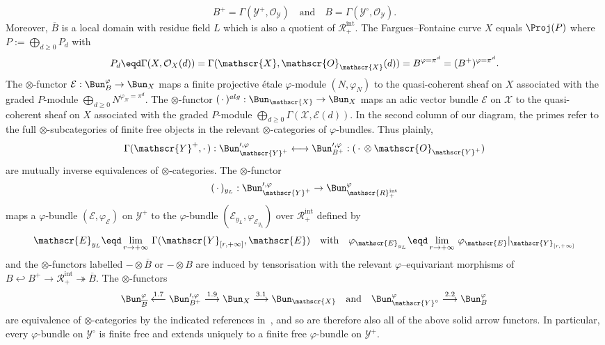 \[
B^{+}=\Gamma(\mathscr{Y}^{+},\mathscr{O}_{\mathscr{Y}})\quad\text{and}\quad B=\Gamma(\mathscr{Y}^{\circ},\mathscr{O}_{\mathscr{Y}}).
\]
Moreover, $\overline{B}$ is a local domain with residue field $L$ which is also a quotient of $\mathscr{R}_{+}^{\mathrm{int}}$. The Fargues--Fontaine curve $X$ equals $\Proj(P)$ where $P:=\bigoplus_{d\geq0}P_{d}$ with
\[
P_{d}\eqd\Gamma(X,\mathcal{O}_{X}(d))=\Gamma(\mathscr{X},\mathscr{O}_{\mathscr{X}}(d))=B^{\varphi=\pi^{d}}=(B^{+})^{\varphi=\pi^{d}}.
\]
The $\otimes$-functor $\mathcal{E}:\Bun_{B}^{\varphi}\rightarrow\Bun_{X}$ maps a finite projective \'etale $\varphi$-module $(N,\varphi_{N})$ to the quasi-coherent sheaf on $X$ associated with the graded $P$-module $\bigoplus_{d\geq0}N^{\varphi_{N}=\pi^{d}}$. The $\otimes$-functor $({\,\cdot\,})^{alg}:\Bun_{\mathscr{X}}\rightarrow\Bun_{X}$ maps an adic vector bundle $\mathscr{E}$ on $\mathscr{X}$ to the quasi-coherent sheaf on $X$ associated with the graded $P$-module $\bigoplus_{d\geq0}\Gamma(\mathscr{X},\mathscr{E}(d))$. In the second column of our diagram, the primes refer to the full $\otimes$-subcategories of finite free objects in the relevant $\otimes$-categories of $\varphi$-bundles. Thus plainly,
\[
\Gamma(\mathscr{Y}^{+},{\cdot\,}):\Bun_{\mathscr{Y}^{+}}^{\prime,\varphi}\longleftrightarrow\Bun_{B^{+}}^{\prime,\varphi}:({\,\cdot\,}\otimes\mathscr{O}_{\mathscr{Y}^{+}})
\]
are mutually inverse equivalences of $\otimes$-categories. The $\otimes$-functor
\[
({\,\cdot\,})_{y_{L}}:\Bun_{\mathscr{Y}^{+}}^{\prime,\varphi}\rightarrow\Bun_{\mathscr{R}_{+}^{\mathrm{int}}}^{\varphi}
\]
maps a $\varphi$-bundle $(\mathscr{E},\varphi_{\mathscr{E}})$ on $\mathscr{Y}^{+}$ to the $\varphi$-bundle $(\mathscr{E}_{y_{L}},\varphi_{\mathscr{E}_{y_{L}}})$ over $\mathscr{R}_{+}^{\mathrm{int}}$ defined by
\[
\mathscr{E}_{y_{L}}\eqd\lim_{r\rightarrow\text{+\ensuremath{\infty}}}\,\Gamma(\mathscr{Y}_{[r,+\infty]},\mathscr{E})\quad\text{with}\quad\varphi_{\mathscr{E}_{y_{L}}}\eqd\lim_{r\rightarrow\text{+\ensuremath{\infty}}}\,\varphi_{\mathscr{E}}\vert_{\mathscr{Y}_{[r,+\infty]}}
\]
and the $\otimes$-functors labelled $-\otimes\overline{B}$ or $-\otimes B$ are induced by tensorisation with the relevant $\varphi$--equivariant morphisms of $B\hookleftarrow B^{+}\rightarrow\mathscr{R}_{+}^{\mathrm{int}}\twoheadrightarrow\overline{B}$. The $\otimes$-functors
\[
\Bun_{\overline{B}}^{\varphi}\stackrel{1.7}{\longleftarrow}\Bun_{B^{+}}^{\prime,\varphi}\stackrel{1.9}{\longrightarrow}\Bun_{X}\stackrel{3.1}{\longrightarrow}\Bun_{\mathscr{X}}\quad\text{and}\quad\Bun_{\mathscr{Y}^{\circ}}^{\varphi}\stackrel{2.2}{\longrightarrow}\Bun_{B}^{\varphi}
\]
are equivalence of $\otimes$-categories by the indicated references in~\cite[\S 11]{FaFo15}, and so are therefore also all of the above solid arrow functors. In particular, every $\varphi$-bundle on $\mathscr{Y}^{\circ}$ is finite free and extends uniquely to a finite free $\varphi$-bundle on $\mathscr{Y}^{+}$.

